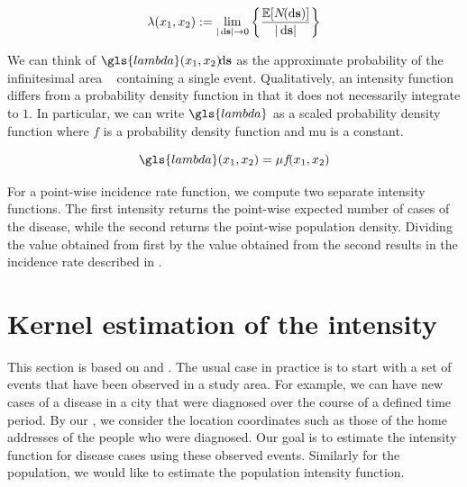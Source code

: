 \begin{equation}
    \label{eq:lambda_differential}
    \lambda \xvec := \lim_{|\ds| \to 0}
        \left\{
            \frac{\mathbb{E}[N\!(\ds)]}%
            {|\ds|}
        \right\}
\end{equation}

We can think of $\gls{lambda}\xvec \!\! \ds$ as the approximate probability of the infinitesimal area \ds~ containing a single \gls{event}.
Qualitatively, an intensity function differs from a probability density function in that it does not necessarily integrate to $1$.
In particular, we can write $\gls{lambda}$ as a scaled probability density function
where $f$ is a probability density function and \gls{mu} is a constant.

\begin{equation}
    \label{eq:lambda_mu}
    \gls{lambda}\xvec = \mu f\!\xvec
\end{equation}

For a point-wise \gls{incidence rate} function,
we compute two separate \gls{intensity} functions.
The first \gls{intensity} returns the point-wise expected number of cases of the disease,
while the second returns the point-wise population density.
Dividing the value obtained from first by the value obtained from the second results in the \gls{incidence rate} described in .

\section{Kernel estimation of the intensity}
\label{sec:theory:kernelestimation}

This section is based on \citet{silverman1986density} and \citet{wand1994kernel}.
The usual case in practice is to start with a set of \glspl{event} that have been observed in a study area.
For example, we can have new cases of a disease in a city that were diagnosed over the course of a defined time period.
By our ,
we consider the location coordinates such as those of the home addresses of the people who were diagnosed.
Our goal is to estimate the \gls{intensity} function for disease cases using these observed \glspl{event}.
Similarly for the population,
we would like to estimate the population \gls{intensity} function.

